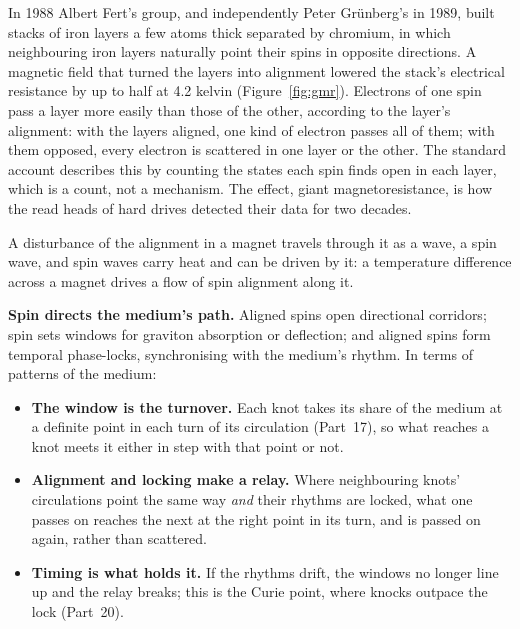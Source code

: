 \documentclass[11pt,a4paper]{article}
\begin{document}
 In 1988 Albert Fert's group, and independently Peter Gr\"unberg's in 1989, built stacks of iron layers a few atoms thick separated by chromium, in which neighbouring iron layers naturally point their spins in opposite directions. A magnetic field that turned the layers into alignment lowered the stack's electrical resistance by up to half at 4.2 kelvin (Figure~\ref{fig:gmr}). Electrons of one spin pass a layer more easily than those of the other, according to the layer's alignment: with the layers aligned, one kind of electron passes all of them; with them opposed, every electron is scattered in one layer or the other. The standard account describes this by counting the states each spin finds open in each layer, which is a count, not a mechanism.  The effect, giant magnetoresistance, is how the read heads of hard drives detected their data for two decades. 

 A disturbance of the alignment in a magnet travels through it as a wave, a spin wave, and spin waves carry heat and can be driven by it: a temperature difference across a magnet drives a flow of spin alignment along it.

\begin{hypbar}
\textbf{Spin directs the medium's path.} Aligned spins open directional corridors; spin sets windows for graviton absorption or deflection; and aligned spins form temporal phase-locks, synchronising with the medium's rhythm. In terms of patterns of the medium:
\begin{itemize}
\item \textbf{The window is the turnover.} Each knot takes its share of the medium at a definite point in each turn of its circulation (Part~17), so what reaches a knot meets it either in step with that point or not.
\item \textbf{Alignment and locking make a relay.} Where neighbouring knots' circulations point the same way \emph{and} their rhythms are locked, what one passes on reaches the next at the right point in its turn, and is passed on again, rather than scattered.
\item \textbf{Timing is what holds it.} If the rhythms drift, the windows no longer line up and the relay breaks; this is the Curie point, where knocks outpace the lock (Part~20).
\end{itemize}
\end{hypbar}
\end{document}
